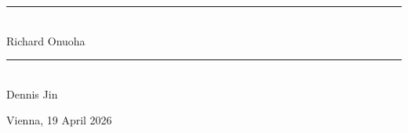 \vspace{2.5cm}

\noindent
\begin{minipage}{0.45\textwidth}
	\begin{center}
		\rule{\linewidth}{1pt} \\
		Richard Onuoha
	\end{center}
\end{minipage}
\hfill
\begin{minipage}{0.45\textwidth}
	\begin{center}
		\rule{\linewidth}{1pt} \\
		Dennis Jin
	\end{center}
\end{minipage}

\vspace{1.5cm}
Vienna, 19 April 2026

